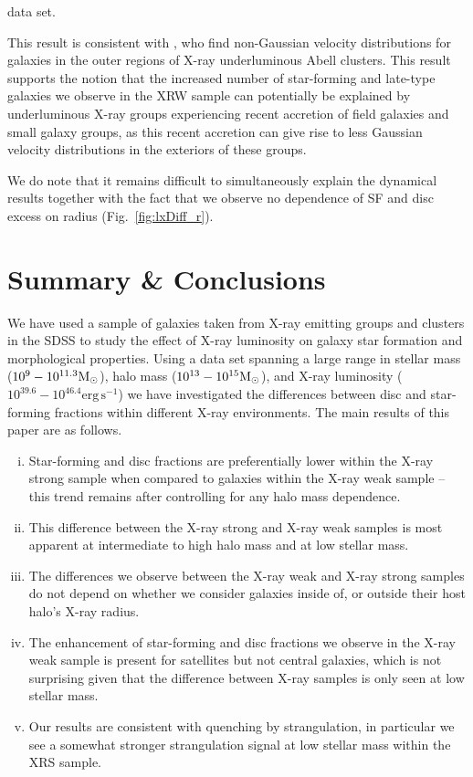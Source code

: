 data set.
\par
This result is consistent with \citet{popesso2007a}, who find
non-Gaussian velocity distributions for galaxies in the outer regions
of X-ray underluminous Abell clusters.  This result supports the
notion that the increased number of star-forming and late-type
galaxies we observe in the XRW sample can potentially be explained by
underluminous X-ray groups experiencing recent accretion of field
galaxies and small galaxy groups, as this recent accretion can give
rise to less Gaussian velocity distributions in the exteriors of these
groups.
\par
We do note that it remains difficult to simultaneously explain the
dynamical results together with the fact that we observe no dependence
of SF and disc excess on radius (Fig.~\ref{fig:lxDiff_r}).

\section{Summary \& Conclusions}
\label{sec:conclusions_x}

We have used a sample of galaxies taken from X-ray emitting groups and
clusters in the SDSS to study the effect of X-ray luminosity on galaxy
star formation and morphological properties.  Using a data set
spanning a large range in stellar mass ($10^9 - 10^{11.3}\mathrm{M_{\odot}}$), halo
mass ($10^{13} - 10^{15}\mathrm{M_{\odot}}$), and X-ray luminosity ($10^{39.6} -
10^{46.4}\mathrm{erg}\,\mathrm{s^{-1}}$) we have investigated the
differences between disc and star-forming fractions within different
X-ray environments.  The main results of this paper are as follows.

\begin{enumerate}[(i)]
  \item Star-forming and disc fractions are preferentially lower
    within the X-ray strong sample when compared to galaxies within
    the X-ray weak sample -- this trend remains after controlling for
    any halo mass dependence.

  \item This difference between the X-ray strong and X-ray weak
    samples is most apparent at intermediate to high halo mass and at
    low stellar mass.

  \item The differences we observe between the X-ray weak and X-ray
    strong samples do not depend on whether we consider galaxies
    inside of, or outside their host halo's X-ray radius.

  \item The enhancement of star-forming and disc fractions we observe
    in the X-ray weak sample is present for satellites but not central
    galaxies, which is not surprising given that the difference
    between X-ray samples is only seen at low stellar mass.

  \item Our results are consistent with quenching by strangulation, in
    particular we see a somewhat stronger strangulation signal at low
    stellar mass within the XRS sample.
\end{enumerate}

%


